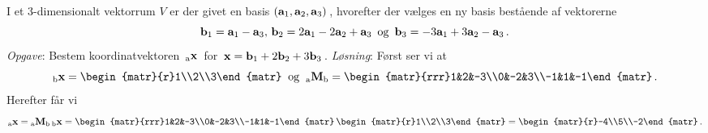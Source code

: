 \begin{example}\label{tn8.exAbildM1}
I et 3-dimensionalt vektorrum $V$ er der givet en basis $(\mathbf{a}_1,\mathbf{a}_2,\mathbf{a}_3)\,$, hvorefter der vælges en ny basis bestående af vektorerne $$\mathbf{b}_1=\mathbf{a}_1-\mathbf{a}_3,\, \mathbf{b}_2=2\mathbf{a}_1-2\mathbf{a}_2+\mathbf{a}_3\,\,\,\mathrm{og}\,\,\,\mathbf{b}_3=-3\mathbf{a}_1+3\mathbf{a}_2-\mathbf{a}_3\,.$$
\textit{Opgave}: Bestem koordinatvektoren $\,{_\mathrm{a}\mathbf{x}}\,$ for $\,\mathbf x=\mathbf{b}_1+2\mathbf{b}_2+3\mathbf{b}_3\,$.\bs
\textit{Løsning}: Først ser vi at
\begin{equation}\label{tn8.exAbildM1.1}
\vekind bx = \begin{matr}{r}1\\2\\3\end{matr}\mathrm{\;\;og\;\;}
\matind aMb=\begin{matr}{rrr}1&2&-3\\0&-2&3\\-1&1&-1\end{matr}\,.
\end{equation}
Herefter får vi
\begin{equation}\label{tn8.exAbildM1.2}
\vekind ax =\matind aMb \,\vekind bx=
\begin{matr}{rrr}1&2&-3\\0&-2&3\\-1&1&-1\end{matr}\,
\begin{matr}{r}1\\2\\3\end{matr}=
\begin{matr}{r}-4\\5\\-2\end{matr}\,.
\end{equation}
\end{example}

